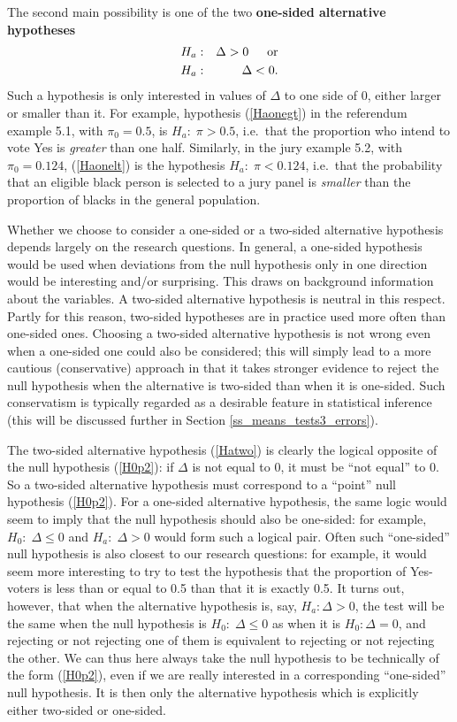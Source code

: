 The second main possibility is one of the two
\textbf{one-sided alternative hypotheses}
\begin{eqnarray}
H_{a}:&&  \Delta> 0 \hspace*{1.5em}\text{or}
\label{Haonegt}
\\
H_{a}:&&  \Delta < 0.
\label{Haonelt}
\end{eqnarray}
Such a hypothesis is only interested in values of $\Delta$ to one side
of 0, either larger or smaller than it. For example, hypothesis
(\ref{Haonegt}) in the referendum example 5.1, with $\pi_{0}=0.5$, is
$H_{a}:\; \pi>0.5$, i.e.\ that the proportion who intend to
vote Yes is \emph{greater} than one half. Similarly, in the jury example
5.2, with $\pi_{0}=0.124$, (\ref{Haonelt}) is the hypothesis
$H_{a}:\; \pi<0.124$, i.e.\ that the probability that an eligible black
person is selected to a jury panel is \emph{smaller} than the proportion
of blacks in the general population.

Whether we choose to consider a one-sided or a two-sided alternative
hypothesis depends largely on the research questions. In general, a
one-sided hypothesis would be used when deviations from the null
hypothesis only in one direction would be interesting and/or surprising.
This draws on background information about the
variables. A two-sided alternative hypothesis is
neutral in this respect. Partly for this reason, two-sided
hypotheses are in practice used more often than one-sided ones.
Choosing a two-sided alternative
hypothesis is not wrong even when a one-sided one could also be
considered; this will simply lead to a more cautious
(conservative) approach in that it takes stronger evidence to reject the
null hypothesis when the alternative is two-sided than when it is
one-sided. Such conservatism is typically regarded as a desirable
feature in statistical inference (this will be discussed further in
Section \ref{ss_means_tests3_errors}).

\label{p_onesidednull}
The two-sided alternative hypothesis (\ref{Hatwo}) is clearly the
logical opposite of the null hypothesis (\ref{H0p2}): if $\Delta$ is not
equal to 0, it must be ``not equal'' to 0. So a two-sided alternative
hypothesis must correspond to a ``point'' null hypothesis (\ref{H0p2}).
For a one-sided alternative hypothesis, the same logic would seem to
imply that the null hypothesis should also be one-sided: for example,
$H_{0}: \; \Delta\le 0$ and $H_{a}:\; \Delta>0$ would form such a
logical pair. Often such ``one-sided'' null hypothesis is also closest
to our research questions: for example, it would seem more interesting
to try to test the hypothesis that the proportion of Yes-voters is less
than or equal to 0.5 than that it is exactly 0.5.
It turns out, however, that when the
alternative hypothesis is, say, $H_{a}: \Delta>0$, the test will be the
same when the null hypothesis is $H_{0}: \; \Delta\le 0$ as when it is
$H_{0}: \Delta= 0$, and rejecting or not rejecting one of them is
equivalent to rejecting or not rejecting the other. We can thus here
always take the null hypothesis to be technically of the form
(\ref{H0p2}), even if we are really interested in a corresponding
``one-sided'' null hypothesis. It is then only the alternative
hypothesis which is explicitly either two-sided or one-sided.

